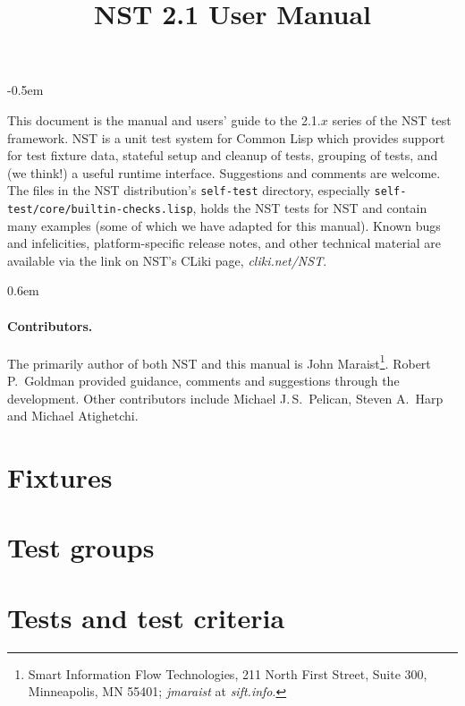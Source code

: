 \documentclass{article}
\title{NST 2.1 User Manual}
\begin{document}
\maketitle
\thispagestyle{empty}
\parskip -0.5em

\noindent This document is the manual and users' guide to the 2.1.$x$
series of the NST test framework.  NST is a unit test system for
Common Lisp which provides support for test fixture data, stateful
setup and cleanup of tests, grouping of tests, and (we think!) a
useful runtime interface.  Suggestions and comments are welcome.  The
files in the NST distribution's \texttt{self-test} directory,
especially \texttt{self-test/core/builtin-checks.lisp}, holds the NST
tests for NST and contain many examples (some of which we have adapted
for this manual).  Known bugs and infelicities, platform-specific
release notes, and other technical material are available via the link
on NST's CLiki page, \textsl{cliki.net/NST}\enspace.

\tableofcontents
\parskip 0.6em
\parindent 0pt

\paragraph{Contributors.}
The primarily author of both NST and this manual is John
Maraist\footnote{Smart Information Flow Technologies, 211 North First
  Street, Suite 300, Minneapolis, MN 55401; \textsl{jmaraist} at
  \textsl{sift.info}.}.  Robert P.\ Goldman provided guidance,
comments and suggestions through the development.  Other contributors
include Michael J.\,S.\ Pelican, Steven A.\ Harp and Michael
Atighetchi.  \cleardoublepage
{}

\section{Fixtures}
\label{fixtures}



\section{Test groups}
\label{sec:groups}


\section{Tests and test criteria}
\label{sec:deftest}

\end{document}
